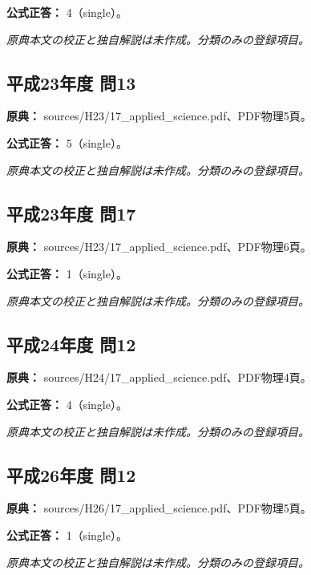 \textbf{公式正答：} 4（single）。

\par\textit{原典本文の校正と独自解説は未作成。分類のみの登録項目。}

\subsection{平成23年度 問13}
\label{q:h23-reg-applied-13}

\noindent\textbf{原典：} sources/H23/17\_applied\_science.pdf、PDF物理5頁。

\textbf{公式正答：} 5（single）。

\par\textit{原典本文の校正と独自解説は未作成。分類のみの登録項目。}

\subsection{平成23年度 問17}
\label{q:h23-reg-applied-17}

\noindent\textbf{原典：} sources/H23/17\_applied\_science.pdf、PDF物理6頁。

\textbf{公式正答：} 1（single）。

\par\textit{原典本文の校正と独自解説は未作成。分類のみの登録項目。}

\subsection{平成24年度 問12}
\label{q:h24-reg-applied-12}

\noindent\textbf{原典：} sources/H24/17\_applied\_science.pdf、PDF物理4頁。

\textbf{公式正答：} 4（single）。

\par\textit{原典本文の校正と独自解説は未作成。分類のみの登録項目。}

\subsection{平成26年度 問12}
\label{q:h26-reg-applied-12}

\noindent\textbf{原典：} sources/H26/17\_applied\_science.pdf、PDF物理5頁。

\textbf{公式正答：} 1（single）。

\par\textit{原典本文の校正と独自解説は未作成。分類のみの登録項目。}


